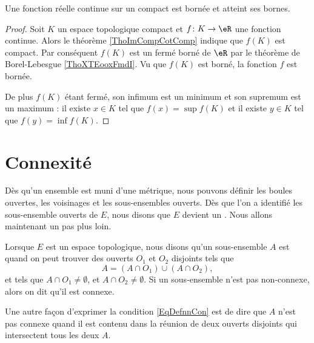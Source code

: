 \begin{theorem}\label{ThoMKKooAbHaro}
    Une fonction réelle continue sur un compact est bornée et atteint ses bornes.
\end{theorem}

\begin{proof}
    Soit \( K\) un espace topologique compact et \( f\colon K\to \eR\) une fonction continue. Alors le théorème \ref{ThoImCompCotComp} indique que \( f(K)\) est compact. Par conséquent \( f(K)\) est un fermé borné de \( \eR\) par le théorème de Borel-Lebesgue \ref{ThoXTEooxFmdI}. Vu que \( f(K)\) est borné, la fonction \( f\) est bornée.

    De plus \( f(K)\) étant fermé, son infimum est un minimum et son supremum est un maximum : il existe \( x\in K\) tel que \( f(x)=\sup f(K)\) et il existe \( y\in K\) tel que \( f(y)=\inf f(K)\).
\end{proof}




\section{Connexité}

Dès qu'un ensemble est muni d'une métrique, nous pouvons définir les boules ouvertes, les voisinages et les sous-ensembles ouverts. Dès que l'on a identifié les sous-ensemble ouverts de $E$, nous disons que $E$ devient un . Nous allons maintenant un pas plus loin.

\begin{definition}
     Lorsque $E$ est un espace topologique, nous disons qu'un sous-ensemble $A$ est  quand on peut trouver des ouverts $O_1$ et $O_2$ disjoints tels que
    \begin{equation}    \label{EqDefnnCon}
        A=(A\cap O_1)\cup (A\cap O_2),
    \end{equation}
    et tels que $A\cap O_1\neq\emptyset$, et $A\cap O_2\neq\emptyset$. Si un sous-ensemble n'est pas non-connexe, alors on dit qu'il est connexe.
\end{definition}
Une autre façon d'exprimer la condition \eqref{EqDefnnCon} est de dire que $A$ n'est pas connexe quand il est contenu dans la réunion de deux ouverts disjoints qui intersectent tous les deux $A$.

